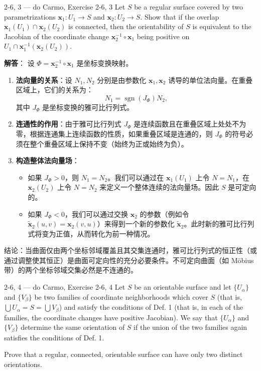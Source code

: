 \begin{exercise}{2-6, 3 — do Carmo, Exercise 2-6, 3}
Let $S$ be a regular surface covered by two parametrizations $\mathbf{x}_1: U_1 \to S$ and $\mathbf{x}_2: U_2 \to S$. Show that if the overlap $\mathbf{x}_1(U_1) \cap \mathbf{x}_2(U_2)$ is connected, then the orientability of $S$ is equivalent to the Jacobian of the coordinate change $\mathbf{x}_2^{-1} \circ \mathbf{x}_1$ being positive on $U_1 \cap \mathbf{x}_1^{-1}(\mathbf{x}_2(U_2))$.
\end{exercise}

\begin{solution}
\textbf{解答}：
设 $\Phi = \mathbf{x}_2^{-1} \circ \mathbf{x}_1$ 是坐标变换映射。

\begin{enumerate}
    \item \textbf{法向量的关系}：设 $N_1, N_2$ 分别是由参数化 $\mathbf{x}_1, \mathbf{x}_2$ 诱导的单位法向量。在重叠区域上，它们的关系为：
    \[
    N_1 = \operatorname{sgn}(J_\Phi) N_2,
    \]
    其中 $J_\Phi$ 是坐标变换的雅可比行列式。
    \item \textbf{连通性的作用}：由于雅可比行列式 $J_\Phi$ 是连续函数且在重叠区域上处处不为零，根据连通集上连续函数的性质，如果重叠区域是连通的，则 $J_\Phi$ 的符号必须在整个重叠区域上保持不变（始终为正或始终为负）。
    \item \textbf{构造整体法向量场}：
    \begin{itemize}
        \item 如果 $J_\Phi > 0$，则 $N_1 = N_2$。我们可以通过在 $\mathbf{x}_1(U_1)$ 上令 $N = N_1$，在 $\mathbf{x}_2(U_2)$ 上令 $N = N_2$ 来定义一个整体连续的法向量场。因此 $S$ 是可定向的。
        \item 如果 $J_\Phi < 0$，我们可以通过交换 $\mathbf{x}_2$ 的参数（例如令 $\tilde{\mathbf{x}}_2(u,v) = \mathbf{x}_2(v,u)$）来得到一个新的参数化 $\tilde{\mathbf{x}}_2$。此时新的雅可比行列式将变为正值，从而转化为前一种情况。
    \end{itemize}
\end{enumerate}
结论：当曲面仅由两个坐标邻域覆盖且其交集连通时，雅可比行列式的恒正性（或通过调整使其恒正）是曲面可定向性的充分必要条件。不可定向曲面（如 Möbius 带）的两个坐标邻域交集必然是不连通的。
\end{solution}

\begin{exercise}{2-6, 4 — do Carmo, Exercise 2-6, 4}
Let $S$ be an orientable surface and let $\{U_{\alpha}\}$ and $\{V_{\beta}\}$ be two families of coordinate neighborhoods which cover $S$ (that is, $\bigcup U_{\alpha} = S = \bigcup V_{\beta}$) and satisfy the conditions of Def. 1 (that is, in each of the families, the coordinate changes have positive Jacobian). We say that $\{U_{\alpha}\}$ and $\{V_{\beta}\}$ determine the same orientation of $S$ if the union of the two families again satisfies the conditions of Def. 1.

Prove that a regular, connected, orientable surface can have only two distinct orientations.
\end{exercise}

